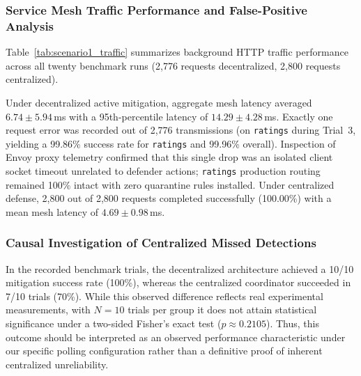 \subsubsection{Service Mesh Traffic Performance and False-Positive Analysis}
Table~\ref{tab:scenario1_traffic} summarizes background HTTP traffic performance across all twenty benchmark runs (2,776 requests decentralized, 2,800 requests centralized). 

Under decentralized active mitigation, aggregate mesh latency averaged $6.74\pm 5.94$\,ms with a 95th-percentile latency of $14.29\pm 4.28$\,ms. Exactly one request error was recorded out of 2,776 transmissions (on \texttt{ratings} during Trial~3, yielding a 99.86\% success rate for \texttt{ratings} and 99.96\% overall). Inspection of Envoy proxy telemetry confirmed that this single drop was an isolated client socket timeout unrelated to defender actions; \texttt{ratings} production routing remained 100\% intact with zero quarantine rules installed. Under centralized defense, 2,800 out of 2,800 requests completed successfully (100.00\%) with a mean mesh latency of $4.69\pm 0.98$\,ms.

\subsubsection{Causal Investigation of Centralized Missed Detections}
In the recorded benchmark trials, the decentralized architecture achieved a 10/10 mitigation success rate (100\%), whereas the centralized coordinator succeeded in 7/10 trials (70\%). While this observed difference reflects real experimental measurements, with $N=10$ trials per group it does not attain statistical significance under a two-sided Fisher's exact test ($p \approx 0.2105$). Thus, this outcome should be interpreted as an observed performance characteristic under our specific polling configuration rather than a definitive proof of inherent centralized unreliability.

